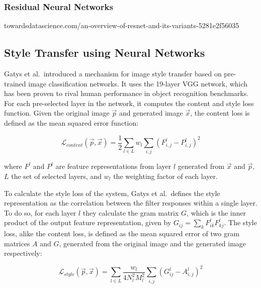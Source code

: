 \documentclass[]{article}
\begin{document}
\hypertarget{residual-neural-networks}{%
\subsubsection{Residual Neural
Networks}\label{residual-neural-networks}}

{towardsdatascience.com/an-overview-of-resnet-and-its-variants-5281e2f56035}

\hypertarget{style-transfer-using-neural-networks}{%
\subsection{Style Transfer using Neural
Networks}\label{style-transfer-using-neural-networks}}

Gatys et al.~introduced a mechanism for image style transfer based on
pre-trained image classification networks. It uses the 19-layer VGG
network, which has been proven to rival human performance in object
recognition benchmarks. For each pre-selected layer in the network, it
computes the content and style loss function. Given the original image
\(\vec{p}\) and generated image \(\vec{x}\), the content loss is defined
as the mean squared error function:

\begin{equation}
    \mathcal{L}_{content}(\vec{p}, \vec{x}) = \frac{1}{2} \sum_{l \in L} w_l \sum_{i,j} (F^l_{i, j} - P^l_{i, j})^2
\end{equation}

where \(F^l\) and \(P^l\) are feature representations from layer \(l\)
generated from \(\vec{x}\) and \(\vec{p}\), \(L\) the set of selected
layers, and \(w_l\) the weighting factor of each layer.

To calculate the style loss of the system, Gatys et al.~defines the
style representation as the correlation between the filter responses
within a single layer. To do so, for each layer \(l\) they calculate the
gram matrix \(G\), which is the inner product of the output feature
representation, given by \(G_{ij} = \sum_{k} F^l_{ik} F^l_{kj}\). The
style loss, alike the content loss, is defined as the mean squared error
of two gram matrices \(A\) and \(G\), generated from the original image
and the generated image respectively:

\begin{equation}
    \mathcal{L}_{style}(\vec{p}, \vec{x}) =  \sum_{l \in L} \frac{w_l}{4 N_l^2 M_l^2} \sum_{i, j} (G^l_{ij} - A^l_{i, j})^2
\end{equation}
\end{document}
